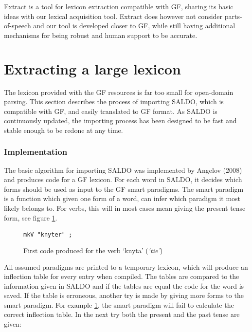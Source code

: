 \documentclass[10pt, a4paper]{article}
\begin{document}
Extract \cite{MarkusForsberg2007} is a tool for lexicon
extraction compatible with GF, sharing its basic ideas with our lexical
acquisition tool. Extract does however not consider parts-of-speech and our
tool is developed closer to GF, while still
having additional mechanisms for being robust and human support to be accurate.


\section{Extracting a large lexicon}
\label{sec:extractsaldo}
The lexicon provided with the GF resources is far too small for open-domain
parsing.
This section describes the process of importing SALDO, which is 
compatible with GF, and easily translated to GF format.
As SALDO is continuously updated, the importing process has been designed to be fast
and stable enough to be redone at any time.

\subsubsection{Implementation}
The basic algorithm for importing SALDO was implemented by Angelov (2008)
and  produces code for a GF lexicon.
For each word in SALDO, it decides which forms should be used as input
to the GF smart paradigms. The smart paradigm is a function which given one
form of a word, can infer which paradigm it most likely belongs to.
For verbs, this will in most cases mean giving
the present tense form, see figure \ref{fig:saldoknyt}. \\

\begin{figure}[h]
\begin{center}
\verb-mkV "knyter" ;-
\caption{First code produced for the verb `knyta' (\emph{`tie'})}
\label{fig:saldoknyt}
\end{center}
\end{figure}

All assumed paradigms are printed to a temporary lexicon, 
which will produce an inflection table for every entry when compiled.
The tables are compared to the information given
in SALDO and if the tables are equal the code for the word is saved. If the table
is erroneous, another try is made
by giving more forms to the smart paradigm.
For example \ref{fig:saldoknyt}, the smart paradigm will fail to calculate the
correct inflection table. In the next try both the present and the past tense
are given:\\
\end{document}
